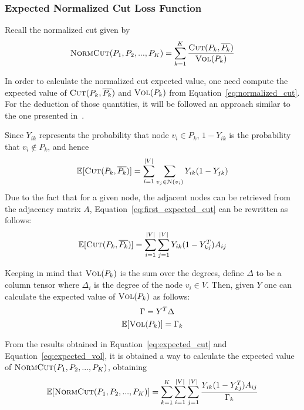 \subsubsection{Expected Normalized Cut Loss Function}
Recall the normalized cut given by
\begin{equation}
    \label{eq:normalized_cut}
        \textsc{NormCut}(P_1, P_2, ..., P_K) = \sum_{k=1}^K \frac{\textsc{Cut}(P_k, \overline{P_k})}{\textsc{Vol}(P_k)}
\end{equation}
    
In order to calculate the normalized cut expected value, one need compute the expected value of $\textsc{Cut}(P_k, \overline{P_k})$ and $\textsc{Vol}(P_k)$ from Equation~\ref{eq:normalized_cut}. For the deduction of those quantities, it will be followed an approach similar to the one presented in~\citep{gap2}.

Since $Y_{ik}$ represents the probability that node $v_i\in P_k$, $1 - Y_{ik}$ is the probability that $v_i\notin P_k$, and hence 
\begin{equation}
    \label{eq:first_expected_cut}
    \mathbb{E}[\textsc{Cut}(P_k, \overline{P_k})] = \sum_{i=1}^{|V|} \sum_{v_j\in\EuScript{N}(v_i)} Y_{ik}(1-Y_{jk})
\end{equation}
Due to the fact that for a given node, the adjacent nodes can be retrieved from the adjacency matrix $A$, Equation~\ref{eq:first_expected_cut} can be rewritten as follows:
\begin{equation}
    \label{eq:expected_cut}
    \mathbb{E}[\textsc{Cut}(P_k, \overline{P_k})] = \sum_{i=1}^{|V|}\sum_{j=1}^{|V|}Y_{ik}(1-Y_{kj}^T)A_{ij} 
\end{equation}

Keeping in mind that $\textsc{Vol}(P_k)$ is the sum over the degrees, define $\Delta$ to be a column tensor where $\Delta_i$ is the degree of the node $v_i\in V$. Then, given $Y$ one can calculate the expected value of $\textsc{Vol}(P_k)$ as follows:
\begin{equation}
    \label{eq:expected_vol}
    \begin{split}
        \Gamma &= Y^T\Delta \\
        \mathbb{E}[\textsc{Vol}&(P_k)] = \Gamma_k
    \end{split}
\end{equation}

From the results obtained in Equation~\ref{eq:expected_cut} and Equation~\ref{eq:expected_vol}, it is obtained a way to calculate the expected value of $\textsc{NormCut}(P_1, P_2, ..., P_K)$, obtaining
\begin{equation}
    \label{eq:expected_norm_cut}
    \mathbb{E}[\textsc{NormCut}(P_1, P_2, ..., P_K)] = \sum_{k=1}^K\sum_{i=1}^{|V|}\sum_{j=1}^{|V|}\frac{Y_{ik}(1-Y_{kj}^T)A_{ij}}{\Gamma_k}
\end{equation}

